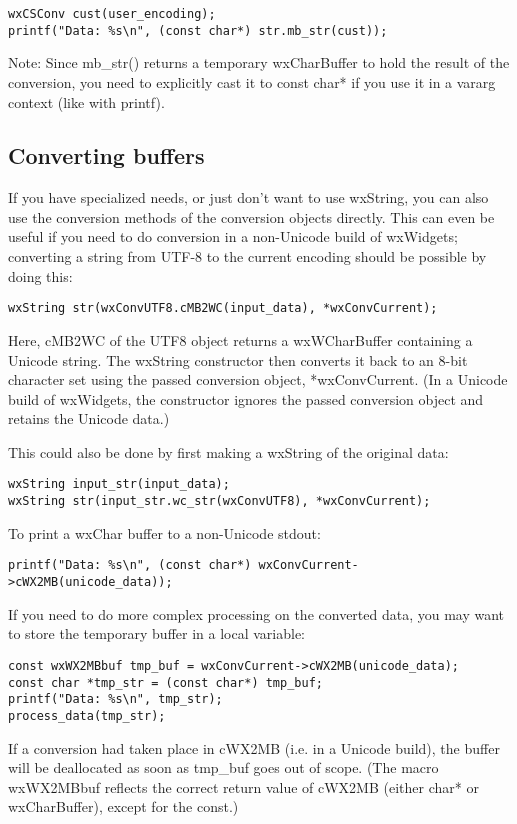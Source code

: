 \begin{verbatim}
wxCSConv cust(user_encoding);
printf("Data: %s\n", (const char*) str.mb_str(cust));
\end{verbatim}

Note: Since mb\_str() returns a temporary wxCharBuffer to hold the result
of the conversion, you need to explicitly cast it to const char* if you use
it in a vararg context (like with printf).

\subsection{Converting buffers}\label{convertingbuffers}

If you have specialized needs, or just don't want to use wxString, you
can also use the conversion methods of the conversion objects directly.
This can even be useful if you need to do conversion in a non-Unicode
build of wxWidgets; converting a string from UTF-8 to the current
encoding should be possible by doing this:

\begin{verbatim}
wxString str(wxConvUTF8.cMB2WC(input_data), *wxConvCurrent);
\end{verbatim}

Here, cMB2WC of the UTF8 object returns a wxWCharBuffer containing a Unicode
string. The wxString constructor then converts it back to an 8-bit character
set using the passed conversion object, *wxConvCurrent. (In a Unicode build
of wxWidgets, the constructor ignores the passed conversion object and
retains the Unicode data.)

This could also be done by first making a wxString of the original data:

\begin{verbatim}
wxString input_str(input_data);
wxString str(input_str.wc_str(wxConvUTF8), *wxConvCurrent);
\end{verbatim}

To print a wxChar buffer to a non-Unicode stdout:

\begin{verbatim}
printf("Data: %s\n", (const char*) wxConvCurrent->cWX2MB(unicode_data));
\end{verbatim}

If you need to do more complex processing on the converted data, you
may want to store the temporary buffer in a local variable:

\begin{verbatim}
const wxWX2MBbuf tmp_buf = wxConvCurrent->cWX2MB(unicode_data);
const char *tmp_str = (const char*) tmp_buf;
printf("Data: %s\n", tmp_str);
process_data(tmp_str);
\end{verbatim}

If a conversion had taken place in cWX2MB (i.e. in a Unicode build),
the buffer will be deallocated as soon as tmp\_buf goes out of scope.
(The macro wxWX2MBbuf reflects the correct return value of cWX2MB
(either char* or wxCharBuffer), except for the const.)

